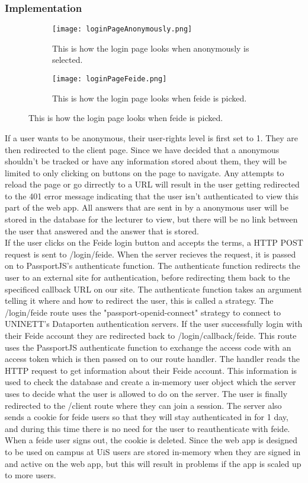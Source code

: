 \subsubsection{Implementation}
\begin{figure}[h]
    \centering
    \begin{subfigure}{0.45\linewidth}
        \texttt{[image: loginPageAnonymously.png]}
        \caption{This is how the login page looks when anonymously is selected.}
        \label{fig:loginPageAnonoumsly}
    \end{subfigure}
    \begin{subfigure}{0.45\linewidth}
        \texttt{[image: loginPageFeide.png]}
        \caption{This is how the login page looks when feide is picked.}
        \label{fig:loginPageFeide}
    \end{subfigure}
\end{figure}
\noindent
If a user wants to be anonymous, their user-rights level is first set to 1. They are then redirected to the client page. Since we have decided that a anonymous shouldn't be tracked or have any information stored about them, they will be limited to only clicking on buttons on the page to navigate. Any attempts to reload the page or go dirrectly to a URL will result in the user getting redirected to the 401 error message indicating that the user isn't authenticated to view this part of the web app. All answers that are sent in by a anonymous user will be stored in the database for the lecturer to view, but there will be no link between the user that answered and the answer that is stored.
\\[11pt]
If the user clicks on the Feide login button and accepts the terms, a HTTP POST request is sent to /login/feide. When the server recieves the request, it is passed on to PassportJS's authenticate function. The authenticate function redirects the user to an external site for authentication, before redirecting them back to the specificed callback URL on our site. The authenticate function takes an argument telling it where and how to redirect the user, this is called a strategy. The /login/feide route uses the "passport-openid-connect" strategy to connect to UNINETT's Dataporten authentication servers. If the user successfully login with their Feide account they are redirected back to /login/callback/feide. This route uses the PassportJS authenticate function to exchange the access code with an access token which is then passed on to our route handler. The handler reads the HTTP request to get information about their Feide account. This information is used to check the database and create a in-memory user object which the server uses to decide what the user is allowed to do on the server. The user is finally redirected to the /client route where they can join a session. The server also sends a cookie for feide users so that they will stay authenticated in for 1 day, and during this time there is no need for the user to reauthenticate with feide. When a feide user signs out, the cookie is deleted. Since the web app is designed to be used on campus at UiS users are stored in-memory when they are signed in and active on the web app, but this will result in problems if the app is scaled up to more users.